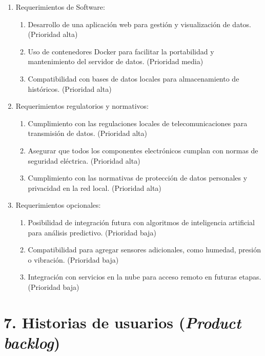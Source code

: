 \documentclass[
11pt, %
]{charter}
\begin{document}
\begin{enumerate}
\begin{enumerate}
	\end{enumerate}
	\item Requerimientos de Software:
	\begin{enumerate}
		\item Desarrollo de una aplicación web para gestión y visualización de datos. (Prioridad alta)
		\item Uso de contenedores Docker para facilitar la portabilidad y mantenimiento del servidor de datos. (Prioridad media)
		\item Compatibilidad con bases de datos locales para almacenamiento de históricos. (Prioridad alta)
	\end{enumerate}
	\item Requerimientos regulatorios y normativos:
	\begin{enumerate}
		\item Cumplimiento con las regulaciones locales de telecomunicaciones para transmisión de datos. (Prioridad alta)
		\item Asegurar que todos los componentes electrónicos cumplan con normas de seguridad eléctrica. (Prioridad alta)
		\item Cumplimiento con las normativas de protección de datos personales y privacidad en la red local. (Prioridad alta)
	\end{enumerate}
	\item Requerimientos opcionales:
	\begin{enumerate}
		\item Posibilidad de integración futura con algoritmos de inteligencia artificial para análisis predictivo. (Prioridad baja)
		\item Compatibilidad para agregar sensores adicionales, como humedad, presión o vibración. (Prioridad baja)
		\item Integración con servicios en la nube para acceso remoto en futuras etapas. (Prioridad baja)
	\end{enumerate}
\end{enumerate}

\section{7. Historias de usuarios (\textit{Product backlog})}
\label{sec:backlog}
\end{document}

